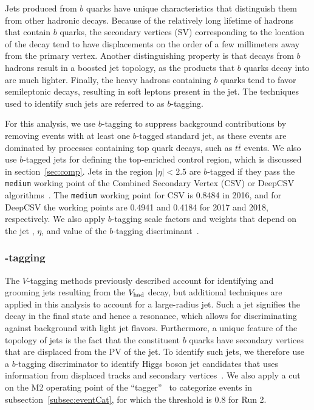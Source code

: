 Jets produced from $b$ quarks have unique characteristics that distinguish them from other hadronic decays.
Because of the relatively long lifetime of hadrons that contain $b$ quarks, the secondary vertices (SV) corresponding to the location of the decay tend to have displacements on the order of a few millimeters away from the primary vertex.
Another distinguishing property is that decays from $b$ hadrons result in a boosted jet topology, as the products that $b$ quarks decay into are much lighter.
Finally, the heavy hadrons containing $b$ quarks tend to favor semileptonic decays, resulting in soft leptons present in the jet.
The techniques used to identify such jets are referred to as $b$-tagging.

For this analysis, we use $b$-tagging to suppress background contributions by removing events with at least one $b$-tagged standard jet, as these events are dominated by processes containing top quark decays, such as $t\bar{t}$ events.
We also use $b$-tagged jets for defining the top-enriched control region, which is discussed in section~\ref{sec:comp}.
Jets in the region $|\eta|<2.5$ are $b$-tagged if they pass the \texttt{medium} working point of the Combined Secondary Vertex (CSV) or DeepCSV algorithms~\cite{Sirunyan_jet}.
The \texttt{medium} working point for CSV is 0.8484 in 2016, and for DeepCSV the working points are 0.4941 and 0.4184 for 2017 and 2018, respectively. %
We also apply $b$-tagging scale factors and weights that depend on the jet \pt, $\eta$, and value of the $b$-tagging discriminant~\cite{bTaggingEff,bTaggingSF}.

\subsubsection{\bbbar-tagging}

The $V$-tagging methods previously described account for identifying and grooming jets resulting from the $V_\mathrm{had}$ decay, but additional techniques are applied in this analysis to account for a large-radius \bbbar jet.
Such a jet signifies the decay \Htobbbar in the final state and hence a \WH resonance, which allows for discriminating against background with light jet flavors.
Furthermore, a unique feature of the topology of \bbbar jets is the fact that the constituent $b$ quarks have secondary vertices that are displaced from the PV of the jet.
To identify such \bbbar jets, we therefore use a $b$-tagging discriminator to identify Higgs boson jet candidates that uses information from displaced tracks and secondary vertices~\cite{CMS-PAS-BTV-15-002}.
We also apply a cut on the M2 operating point of the ``\DoubleB tagger''~\cite{Sirunyan_jet} to categorize events in subsection~\ref{subsec:eventCat}, for which the threshold is 0.8 for Run 2. %

